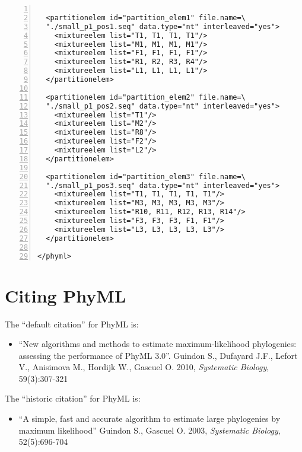 \documentclass[a4paper,12pt]{article}
\begin{document}
\vspace{0.2cm}
\begin{Verbatim}[frame=single, label=Example of PhyML XML file (ctnd), samepage=true,
  baselinestretch=0.5, fontsize=\small, numbers=left]

  <partitionelem id="partition_elem1" file.name=\
  "./small_p1_pos1.seq" data.type="nt" interleaved="yes">
    <mixtureelem list="T1, T1, T1, T1"/>
    <mixtureelem list="M1, M1, M1, M1"/>
    <mixtureelem list="F1, F1, F1, F1"/>
    <mixtureelem list="R1, R2, R3, R4"/>
    <mixtureelem list="L1, L1, L1, L1"/>
  </partitionelem>

  <partitionelem id="partition_elem2" file.name=\
  "./small_p1_pos2.seq" data.type="nt" interleaved="yes">
    <mixtureelem list="T1"/>
    <mixtureelem list="M2"/>
    <mixtureelem list="R8"/>
    <mixtureelem list="F2"/>
    <mixtureelem list="L2"/>
  </partitionelem>

  <partitionelem id="partition_elem3" file.name=\
  "./small_p1_pos3.seq" data.type="nt" interleaved="yes">
    <mixtureelem list="T1, T1, T1, T1, T1"/>
    <mixtureelem list="M3, M3, M3, M3, M3"/>
    <mixtureelem list="R10, R11, R12, R13, R14"/>
    <mixtureelem list="F3, F3, F3, F1, F1"/>
    <mixtureelem list="L3, L3, L3, L3, L3"/>
  </partitionelem>
  
</phyml>

\end{Verbatim}




\section{Citing PhyML}
The ``default citation'' for PhyML is:
\begin{itemize}
\item 
``New algorithms and methods to estimate maximum-likelihood phylogenies: assessing the performance
of PhyML 3.0''. Guindon S., Dufayard J.F., Lefort V., Anisimova M., Hordijk W., Gascuel O. 2010, {\it Systematic
  Biology}, 59(3):307-321

\end{itemize}
The ``historic citation'' for PhyML is:
\begin{itemize}
\item ``A simple, fast and accurate algorithm to estimate large phylogenies by maximum likelihood''
  Guindon S., Gascuel O. 2003, {\it Systematic Biology}, 52(5):696-704
\end{itemize}
\end{document}
